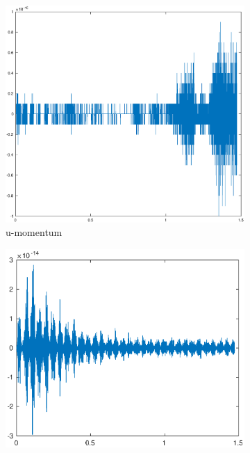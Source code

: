 \begin{figure}[htp]
    \centering
    \begin{subfigure}[b]{0.3\textwidth}
        \centering
        \includegraphics[width=\textwidth]{images/cons_momu.eps}\hfill
        \caption{u-momentum}
        \label{fig:Energy}
    \end{subfigure}
    \hfill
    \begin{subfigure}[b]{0.3\textwidth}
        \centering
        \includegraphics[width=\textwidth]{images/cons_momv.eps}\hfill

\end{subfigure}
\end{figure}
